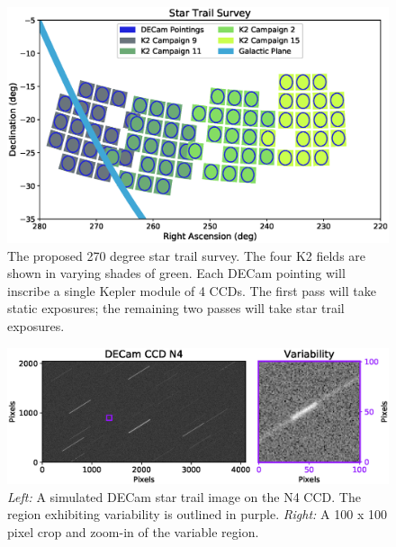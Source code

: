 \documentclass[11pt]{article}
\begin{document}
\begin{figure}[htb]
\center
\includegraphics[width=\columnwidth]{survey.eps}
\caption{The proposed 270 degree star trail survey. The four K2 fields are shown in varying shades of green. Each DECam pointing will inscribe a single Kepler module of 4 CCDs. The first pass will take static exposures; the remaining two passes will take star trail exposures.}
\label{fig:1}
\end{figure}

\begin{figure}[htb]
\center
\includegraphics[width=\columnwidth]{decamtrails.eps}
\caption{\textit{Left:} A simulated DECam star trail image on the N4 CCD. The region exhibiting variability is outlined in purple. \textit{Right:} A 100 x 100 pixel crop and zoom-in of the variable region.}
\label{fig:2}
\end{figure}
\end{document}

